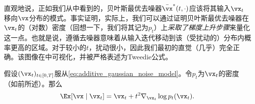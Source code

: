\documentclass[../../book-main_zh.tex]{subfiles}
\begin{document}
直观地说，正如我们从中看到的，贝叶斯最优去噪器\(\bar{\vx}^{\ast}(t, \cdot)\)应该将其输入\(\vx_{t}\)移向\(\vx\)分布的模式。事实证明，实际上，我们可以通过证明贝叶斯最优去噪器在\(\vx_{t}\)的（对数）密度（回想一下，我们将其记为\(p_{t}\)）上\textit{采取了梯度上升步骤}来量化这一点。也就是说，遵循去噪器意味着从输入迭代移动到该（受扰动的）分布内概率更高的区域。对于较小的\(t\)，扰动很小，因此我们最初的直觉（几乎）完全正确。该图像在中可视化，并被严格表述为Tweedie公式\cite{Robbins1956AnEB}。
\begin{theorem}[Tweedie公式]\label{thm:tweedie}
    假设\((\vx_{t})_{t \in [0, T]}\)服从\eqref{eq:additive_gaussian_noise_model}。令\(p_{t}\)为\(\vx_{t}\)的密度（如前所述）。那么
    \begin{equation}\label{eq:tweedie}
        \Ex[\vx \mid \vx_{t}] = \vx_{t} + t^{2}\nabla_{\vx_{t}} \log
        p_{t}(\vx_{t}).
    \end{equation}
\end{theorem}
\end{document}
